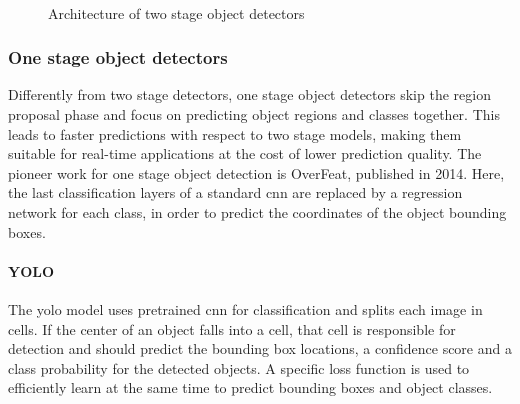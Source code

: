 \documentclass[%
    corpo=12pt,
    twoside,
    stile=classica,   
    tipotesi=magistrale,
    evenboxes,
    english,
	numerazioneromana,
]{toptesi}
\begin{document}
\begin{figure}[ht]
	\centering
	\\
	\caption{Architecture of two stage object detectors}
	\label{fig:architectures}
\end{figure}

\subsubsection{One stage object detectors}
Differently from two stage detectors, one stage object detectors skip the region proposal phase and focus on predicting object regions and classes together. This leads to faster predictions with respect to two stage models, making them suitable for real-time applications at the cost of lower prediction quality. The pioneer work for one stage object detection is OverFeat\cite{sermanet2014overfeat}, published in 2014. Here, the last classification layers of a standard \gls{cnn} are replaced by a regression network for each class, in order to predict the coordinates of the object bounding boxes.

\paragraph{YOLO}\label{sec:yolo}
The \gls{yolo} model\cite{redmon2016look} uses pretrained \gls{cnn} for classification and splits each image in cells. If the center of an object falls into a cell, that cell is responsible for detection and should predict the bounding box locations, a confidence score and a class probability for the detected objects. A specific loss function is used to efficiently learn at the same time to predict bounding boxes and object classes.
\end{document}
